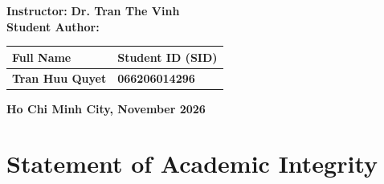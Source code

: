 \documentclass[12pt,a4paper]{report}
\begin{document}
\begin{titlepage}
\begin{singlespace}
    \vspace{0.8cm}
    \begin{minipage}{0.85\textwidth}
        \large
        \textbf{Instructor:} \quad \textbf{Dr. Tran The Vinh}\\[0.35cm]
        \textbf{Student Author:}\\[0.15cm]
        \begin{tabular}{|l|l|}
            \hline
            \textbf{Full Name} & \textbf{Student ID (SID)} \\
            \hline
            \textbf{Tran Huu Quyet} & \textbf{066206014296} \\
            \hline
        \end{tabular}
    \end{minipage}
    
    \vfill
    {\large \textbf{Ho Chi Minh City, November 2026}\par}
    \vspace*{0.2cm}
    \end{singlespace}
\end{titlepage}

\clearpage
{}
\setcounter{page}{1}

\newpage
\chapter*{Statement of Academic Integrity}
\end{document}
